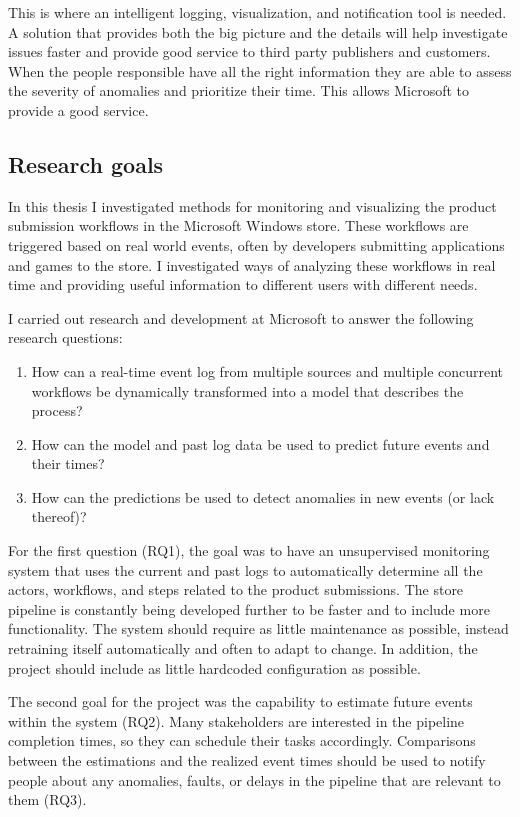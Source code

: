 This is where an intelligent logging, visualization, and notification tool is needed. 
A solution that provides both the big picture and the details will help investigate issues faster and
provide good service to third party publishers and customers.
When the people responsible have all the right information they are able to assess the severity of anomalies and prioritize their time.
This allows Microsoft to provide a good service.

\subsection{Research goals}
In this thesis I investigated methods for monitoring and visualizing the product submission workflows in the Microsoft Windows store.
These workflows are triggered based on real world events, often by developers submitting applications and games to the store.
I investigated ways of analyzing these workflows in real time and providing useful information to different users with different needs. 

I carried out research and development at Microsoft to answer the following research questions:

\begin{enumerate}[label=RQ\arabic*]
    \item How can a real-time event log from multiple sources and multiple concurrent workflows be dynamically transformed into a model that describes the process? 
    \item How can the model and past log data be used to predict future events and their times?
    \item How can the predictions be used to detect anomalies in new events (or lack thereof)?
\end{enumerate}

For the first question (RQ1), the goal was to have an unsupervised monitoring system 
that uses the current and past logs to automatically determine all the actors, 
workflows, and steps related to the product submissions.
The store pipeline is constantly being developed further to be faster and to include more functionality.
The system should require as little maintenance as possible, instead retraining itself automatically and often to adapt to change.
In addition, the project should include as little hardcoded configuration as possible.

The second goal for the project was the capability to estimate future events within the system (RQ2). 
Many stakeholders are interested in the pipeline completion times, so they can schedule their tasks accordingly.
Comparisons between the estimations and the realized event times should be used to notify people about any anomalies, faults, or delays in the pipeline that are relevant to them (RQ3).

